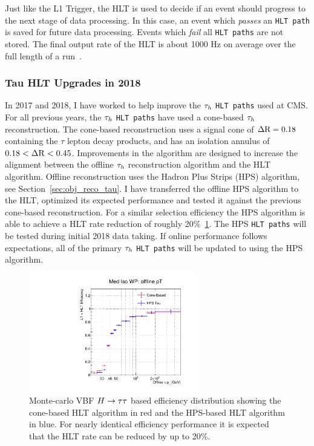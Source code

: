 Just like the L1 Trigger, the HLT is used to decide if an event should progress
to the next stage of data processing. In this case, an event which \textit{passes}
an \texttt{HLT path} is saved for future data processing. Events which \textit{fail}
all \texttt{HLT paths} are not stored. The final output rate of the HLT is
about 1000 Hz on average over the full length of a run~\cite{cms_daq_7097437}.



\subsubsection{Tau HLT Upgrades in 2018}
In 2017 and 2018, I have worked to help improve the $\tau_{h}$ \texttt{HLT paths} 
used at CMS. For all previous years, the $\tau_{h}$ \texttt{HLT paths} have used
a cone-based $\tau_{h}$ reconstruction. The cone-based reconstruction 
uses a signal cone of $\Delta \mathrm{R} = 0.18$ containing the $\tau$ lepton decay products,
and has an isolation annulus of $0.18 < \Delta \mathrm{R} < 0.45$. Improvements in the
algorithm are designed to increase the alignment between the offline $\tau_{h}$
reconstruction algorithm and the HLT algorithm. Offline reconstruction uses
the Hadron Plus Strips (HPS) algorithm, see Section~\ref{sec:obj_reco_tau}.
I have transferred the offline HPS algorithm to the HLT, optimized its expected
performance and tested it against the previous cone-based reconstruction. For a similar
selection efficiency the HPS algorithm is able to achieve a HLT rate
reduction of roughly 20\%~\ref{fig:hlt_hps}. The HPS \texttt{HLT paths}
will be tested during initial 2018 data taking. If online performance
follows expectations, all of the primary $\tau_{h}$ \texttt{HLT paths}
will be updated to using the HPS algorithm.

\begin{figure}[htbp]
\centering
     \includegraphics[width=0.65\textwidth]{cms_and_lhc/plots/eff_Def_vs_HPS_Med_Iso_WP_offline_pT.pdf}
     \caption{
Monte-carlo VBF $H\to\tau\tau$ based efficiency distribution showing the cone-based HLT
algorithm in red and the HPS-based HLT algorithm
in blue. For nearly identical efficiency performance it is expected that
the HLT rate can be reduced by up to 20\%. 
     }
     \label{fig:hlt_hps}
\end{figure}


